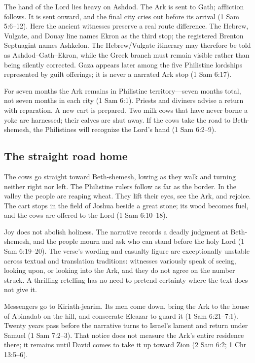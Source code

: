 The hand of the Lord lies heavy on Ashdod.  The Ark is sent to Gath; affliction
follows.  It is sent onward, and the final city cries out before its arrival
(1 Sam 5:6--12).  Here the ancient witnesses preserve a real route difference.
The Hebrew, Vulgate, and Douay line names Ekron as the third stop; the
registered Brenton Septuagint names Ashkelon.  The Hebrew/Vulgate itinerary may
therefore be told as Ashdod--Gath--Ekron, while the Greek branch must remain
visible rather than being silently corrected.  Gaza appears later among the
five Philistine lordships represented by guilt offerings; it is never a
narrated Ark stop (1 Sam 6:17).

For seven months the Ark remains in Philistine territory---seven months total,
not seven months in each city (1 Sam 6:1).  Priests and diviners advise a return
with reparation.  A new cart is prepared.  Two milk cows that have never borne
a yoke are harnessed; their calves are shut away.  If the cows take the road to
Beth-shemesh, the Philistines will recognize the Lord's hand (1 Sam 6:2--9).

\subsection{The straight road home}

The cows go straight toward Beth-shemesh, lowing as they walk and turning
neither right nor left.  The Philistine rulers follow as far as the border.
In the valley the people are reaping wheat.  They lift their eyes, see the Ark,
and rejoice.  The cart stops in the field of Joshua beside a great stone; its
wood becomes fuel, and the cows are offered to the Lord
(1 Sam 6:10--18).

Joy does not abolish holiness.  The narrative records a deadly judgment at
Beth-shemesh, and the people mourn and ask who can stand before the holy Lord
(1 Sam 6:19--20).  The verse's wording and casualty figure are exceptionally
unstable across textual and translation traditions: witnesses variously speak
of seeing, looking upon, or looking into the Ark, and they do not agree on the
number struck.  A thrilling retelling has no need to pretend certainty where
the text does not give it.

Messengers go to Kiriath-jearim.  Its men come down, bring the Ark to the house
of Abinadab on the hill, and consecrate Eleazar to guard it
(1 Sam 6:21--7:1).  Twenty years pass before the narrative turns to Israel's
lament and return under Samuel (1 Sam 7:2--3).  That notice does not measure
the Ark's entire residence there; it remains until David comes to take it up
toward Zion (2 Sam 6:2; 1 Chr 13:5--6).

